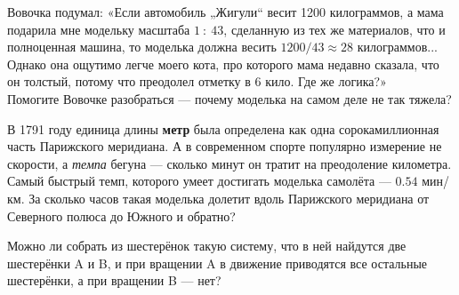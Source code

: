 ﻿
\begin{enumerate}
\itA Вовочка подумал: «Если автомобиль „Жигули“ весит 1200 килограммов, а мама подарила мне модельку масштаба $1\ :\ 43$, сделанную из тех же материалов, что и полноценная машина, то моделька должна весить $1200 / 43 \approx 28$ килограммов... Однако она ощутимо легче моего кота, про которого мама недавно сказала, что он толстый, потому что преодолел отметку в 6 кило. Где же логика?» \smallskip \\
Помогите Вовочке разобраться — почему моделька на самом деле не так тяжела?

\itB В 1791 году единица длины {\bfseries метр} была определена как одна сорокамиллионная часть Парижского меридиана. А в современном спорте популярно измерение не скорости, а {\itshape темпа} бегуна — сколько минут он тратит на преодоление километра. \smallskip \\
Самый быстрый темп, которого умеет достигать моделька самолёта — $0.54$ мин/км. За сколько часов такая моделька долетит вдоль Парижского меридиана от Северного полюса до Южного и обратно?

\itC Можно ли собрать из шестерёнок такую систему, что в ней найдутся две шестерёнки A и B, и при вращении A в движение приводятся все остальные шестерёнки, а при вращении B — нет?
\end{enumerate}